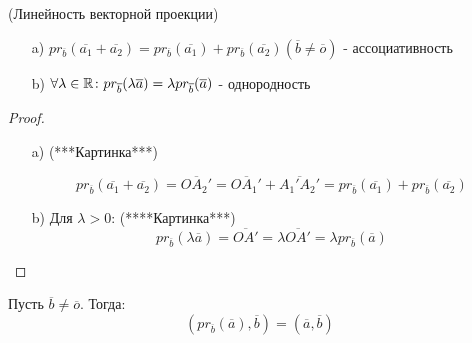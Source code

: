 \begin{statement} (Линейность векторной проекции)
\begin{itemize}
    \item [a) ] $pr_{\overline{b}}(\overline{a_1} + \overline{a_2}) = pr_{\overline{b}}(\overline{a_1}) + pr_{\overline{b}}(\overline{a_2}) ( \overline{b} \neq \overline{o})$ - ассоциативность
    \item [b) ] $\forall \lambda \in \mathbb{R} \colon pr_{\overline{b}} (\lambda \overline{a}) = \lambda pr_{\overline{b}}(\overline{a})$ - однородность
\end{itemize}
\end{statement}
\begin{proof}
    \begin{itemize}
        \item [a) ]
    (***Картинка***)

    \[
        pr_{\overline{b}}(\overline{a_1} + \overline{a_2}) = \overline{OA_2'} = \overline{OA_1'} + \overline{A_1'A_2'} = pr_{\overline{b}}(\overline{a_1}) + pr_{\overline{b}}(\overline{a_2})  
    \] 
\item [b) ] Для $\lambda > 0$:
    (****Картинка***)
    \[
    pr_{\overline{b}}(\lambda\overline{a}) = \overline{OA'} = \lambda \overline{OA'} = \lambda pr_{\overline{b}}(\overline{a})
    \] 
    \end{itemize}
\end{proof}
\begin{statement}
Пусть $\overline{b} \neq \overline{o}$. Тогда:
    \[
        (pr_{\overline{b}}(\overline{a}), \overline{b}) = (\overline{a}, \overline{b})
    \] 
\end{statement}
